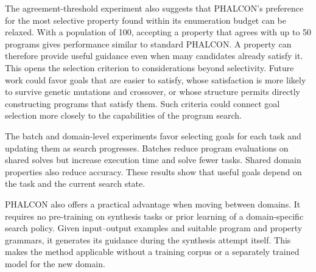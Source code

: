 \documentclass[letterpaper]{article} %
\begin{document}
The agreement-threshold experiment also suggests that PHALCON's
preference for the most selective property found within its enumeration
budget can be relaxed. With a population of 100, accepting a property
that agrees with up to 50 programs gives performance similar to standard
PHALCON. A property can therefore provide useful guidance even when
many candidates already satisfy it. This opens the selection criterion
to considerations beyond selectivity. Future work could favor goals
that are easier to satisfy, whose satisfaction is more likely to survive
genetic mutations and crossover, or whose structure permits directly
constructing programs that satisfy them. Such criteria could connect
goal selection more closely to the capabilities of the program search.

The batch and domain-level experiments favor selecting goals for each
task and updating them as search progresses. Batches reduce program evaluations on shared solves but increase
execution time and solve fewer tasks. Shared domain properties also
reduce accuracy. These results show that useful goals depend on the
task and the current search state.

PHALCON also offers a practical advantage when moving between domains.
It requires no pre-training on synthesis tasks or prior learning of a
domain-specific search policy. Given input--output examples and suitable
program and property grammars, it generates its guidance during the
synthesis attempt itself. This makes the method applicable without a
training corpus or a separately trained model for the new domain.



\end{document}
